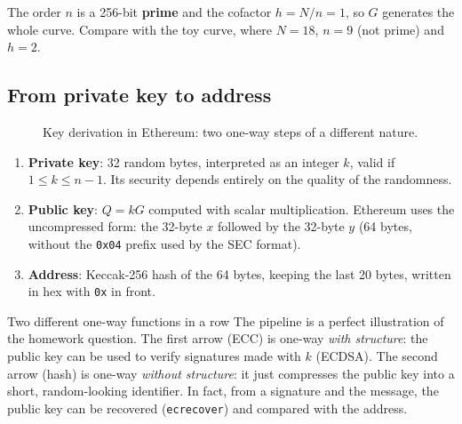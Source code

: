 The order $n$ is a 256-bit \textbf{prime} and the cofactor $h = N/n = 1$, so $G$ generates the whole curve. Compare with the toy curve, where $N = 18$, $n = 9$ (not prime) and $h = 2$.

\subsection{From private key to address}

\begin{figure}[H]
  \centering
  \caption{Key derivation in Ethereum: two one-way steps of a different nature.}
  \label{fig:eth}
\end{figure}

\begin{enumerate}
  \item \textbf{Private key}: 32 random bytes, interpreted as an integer $k$, valid if $1 \le k \le n-1$. Its security depends entirely on the quality of the randomness.
  \item \textbf{Public key}: $Q = kG$ computed with scalar multiplication. Ethereum uses the uncompressed form: the 32-byte $x$ followed by the 32-byte $y$ (64 bytes, without the \texttt{0x04} prefix used by the SEC format).
  \item \textbf{Address}: Keccak-256 hash of the 64 bytes, keeping the last 20 bytes, written in hex with \texttt{0x} in front.
\end{enumerate}

\begin{framedobs}{Two different one-way functions in a row}
  The pipeline is a perfect illustration of the homework question. The first arrow (ECC) is one-way \textit{with structure}: the public key can be used to verify signatures made with $k$ (ECDSA). The second arrow (hash) is one-way \textit{without structure}: it just compresses the public key into a short, random-looking identifier. In fact, from a signature and the message, the public key can be recovered (\texttt{ecrecover}) and compared with the address.
\end{framedobs}

